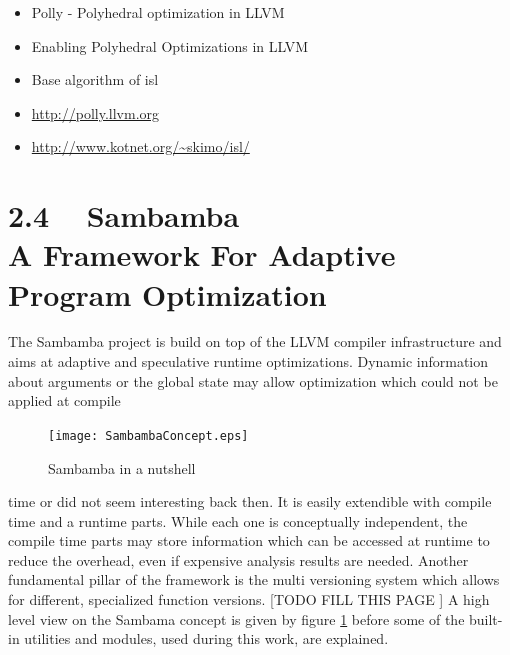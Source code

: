 \begin{itemize}
  \item Polly - Polyhedral optimization in LLVM \cite{grosser.11.impact}  
  \item Enabling Polyhedral Optimizations in LLVM \cite{grosser:thesis}
  \item Base algorithm of isl \cite{Bondhugula:2008:PAP:1379022.1375595}
  \item \url{http://polly.llvm.org} \nocite{Polly:Online}
  \item \url{http://www.kotnet.org/~skimo/isl/} \nocite{ISL:Online}
\end{itemize}





\clearpage
{}
\section*{2.4 ~ Sambamba \\ A Framework For Adaptive Program Optimization}
The Sambamba project is build on top of the LLVM compiler infrastructure and 
aims at adaptive and speculative runtime optimizations.
Dynamic information about arguments or the global state may allow optimization
which could not be applied at compile 
\begin{figure}
  \centering
  \texttt{[image: SambambaConcept.eps]}
  \caption{Sambamba in a nutshell}
  \label{fig:SambambaConcept}  
\end{figure}
time or did not seem interesting back then. It is easily extendible with 
compile time and a runtime parts. While each one is conceptually 
independent, the compile time parts may store information which can be accessed
at runtime to reduce the overhead, even if expensive analysis results are needed. 
Another fundamental pillar of the framework is the multi versioning system which
allows for different, specialized function versions.
[TODO FILL THIS PAGE ]
A high level view on the Sambama concept is given
by figure \ref{fig:SambambaConcept} before some of the  built-in utilities 
and modules, used during this work, are explained. 


